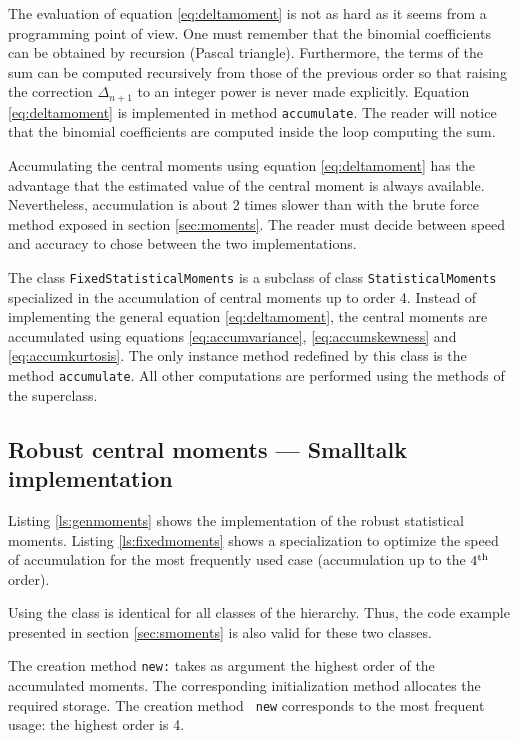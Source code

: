 The evaluation of equation \ref{eq:deltamoment} is not as hard as
it seems from a programming point of view. One must remember that
the binomial coefficients can be obtained by recursion (Pascal
triangle). Furthermore, the terms of the sum can be computed
recursively from those of the previous order so that raising the
correction $\Delta_{n+1}$ to an integer power is never made
explicitly. Equation \ref{eq:deltamoment} is implemented in method
{\tt accumulate}. The reader will notice that the binomial
coefficients are computed inside the loop computing the sum.

Accumulating the central moments using equation
\ref{eq:deltamoment} has the advantage that the estimated value of
the central moment is always available. Nevertheless, accumulation
is about 2 times slower than with the brute force method exposed
in section \ref{sec:moments}. The reader must decide between speed
and accuracy to chose between the two implementations.

The class {\tt FixedStatisticalMoments} is a subclass of class
{\tt StatisticalMoments} specialized in the accumulation of
central moments up to order 4. Instead of implementing the general
equation \ref{eq:deltamoment}, the central moments are accumulated
using equations \ref{eq:accumvariance}, \ref{eq:accumskewness} and
\ref{eq:accumkurtosis}. The only instance method redefined by this
class is the method {\tt accumulate}. All other computations are
performed using the methods of the superclass.

\subsection{Robust central moments --- Smalltalk implementation}
\label{sec:srobustmoment} Listing
\ref{ls:genmoments} shows the implementation of the robust
statistical moments. Listing \ref{ls:fixedmoments} shows a
specialization to optimize the speed of accumulation for the most
frequently used case (accumulation up to the $4^{\mathop{\textrm{th}}}$ order).

Using the class is identical for all classes of the hierarchy.
Thus, the code example presented in section \ref{sec:smoments} is
also valid for these two classes.

The creation method {\tt new:} takes as argument the highest order
of the accumulated moments. The corresponding initialization
method allocates the required storage. The creation method {\tt
new} corresponds to the most frequent usage: the highest order is
4.

